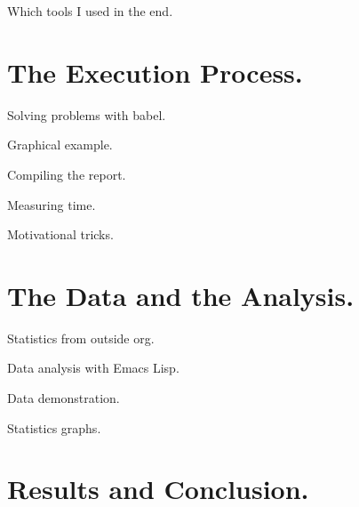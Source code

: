 \documentclass[presentation, CJK, compress]{beamer}
\begin{document}
\begin{frame}[label={sec:org0f56e4e}]{Which tools I used in the end.}
\end{frame}

\section{The Execution Process.}
\label{sec:org4c70654}

\begin{frame}[label={sec:orgc928092}]{Solving problems with babel.}
\end{frame}

\begin{frame}[label={sec:org0d9d16b}]{Graphical example.}
\end{frame}

\begin{frame}[label={sec:orga2442cb}]{Compiling the report.}
\end{frame}

\begin{frame}[label={sec:orgc52e8a9}]{Measuring time.}
\end{frame}

\begin{frame}[label={sec:orgb4dba3f}]{Motivational tricks.}
\end{frame}

\section{The Data and the Analysis.}
\label{sec:orgd0c028c}

\begin{frame}[label={sec:org48e5454}]{Statistics from outside org.}
\end{frame}

\begin{frame}[label={sec:org709e407}]{Data analysis with Emacs Lisp.}
\end{frame}

\begin{frame}[label={sec:org63ef066}]{Data demonstration.}
\end{frame}

\begin{frame}[label={sec:org3d840c8}]{Statistics graphs.}
\end{frame}

\section{Results and Conclusion.}
\label{sec:orgc508110}
\end{document}
